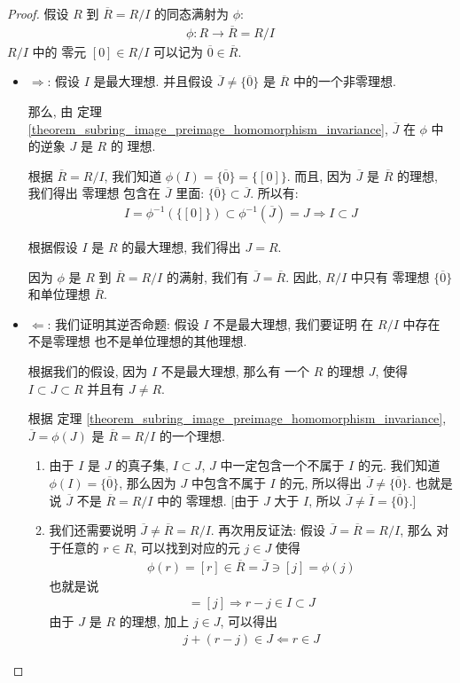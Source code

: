 \documentclass[utf8]{ctexbook}
\begin{document}
\begin{proof}
假设 $R$ 到 $\overline{R} = R/I$ 的同态满射为 $\phi$:
\begin{align*}
\phi: R \longrightarrow \overline{R} = R/I
\end{align*}
$R/I$ 中的 零元 $[0] \in R/I $ 可以记为 $\overline{0} \in \overline{R} $.

\begin{itemize}
\item{$\Longrightarrow$: 假设 $I$ 是最大理想. 并且假设 $\overline{J} \neq \{ \overline{0} \}$ 是 $\overline{R}$ 中的一个非零理想. 

那么, 由 定理 \ref{theorem_subring_image_preimage_homomorphism_invariance}, $\overline{J}$ 在 $\phi$ 中的逆象 $J$ 是 $R$ 的 理想. 

根据 $\overline{R}= R/I$, 我们知道 $\phi(I) = \{ \overline{0} \} = \{ [0] \}$. 而且, 因为 $\overline{J}$ 是 $\overline{R}$ 的理想, 我们得出 零理想 包含在 $\overline{J}$ 里面: $ \{ \overline{0} \} \subset \overline{J} $. 所以有:
\begin{align*}
I = \phi^{-1} (\{ [0] \}) \subset \phi^{-1} (\overline{J}) = J \Longrightarrow I \subset J
\end{align*}

根据假设 $I$ 是 $R$ 的最大理想, 我们得出 $J = R$.

因为 $\phi$ 是 $R$ 到 $\overline{R} =  R/I$ 的满射, 我们有 $\overline{J} = \overline{R} $. 因此, $R/I$ 中只有 零理想 $\{ \overline{0} \}$ 和单位理想 $\overline{R}$.
}
\item{$\Longleftarrow$: 我们证明其逆否命题: 假设 $I$ 不是最大理想, 我们要证明 在 $R/I$ 中存在 不是零理想 也不是单位理想的其他理想.

根据我们的假设, 因为 $I$ 不是最大理想, 那么有 一个 $R$ 的理想 $J$, 使得 $I \subset J \subset R$ 并且有 $J \neq R$. 

根据 定理 \ref{theorem_subring_image_preimage_homomorphism_invariance}, $\overline{J} = \phi(J) $ 是 $\overline{R} = R/I$ 的一个理想.

\begin{enumerate}
\item{由于 $I$ 是 $J$ 的真子集, $I \subset J$, $J$ 中一定包含一个不属于 $I$ 的元. 我们知道 $\phi(I) = \{ \overline{0} \}$, 那么因为 $J$ 中包含不属于 $I$ 的元, 所以得出 $\overline{J} \neq \{ \overline{0 }\}$. 也就是说 $\overline{J}$ 不是 $\overline{R} = R/I$ 中的 零理想. [由于 $J$ 大于 $I$, 所以 $\overline{J} \neq \overline{I} = \{ \overline{0} \}$.]}
\item{我们还需要说明 $\overline{J} \neq \overline{R} = R/I$. 再次用反证法: 假设 $\overline{J} = \overline{R} = R/I$, 那么 对于任意的 $r \in R$, 可以找到对应的元 $j \in J$ 使得 
\begin{align*}
\phi(r) = [r] \in \overline{R} =  \overline{J} \ni [j] = \phi(j)
\end{align*}
也就是说
\begin{align*}
[r] = [j] \Longrightarrow r - j \in I \subset J
\end{align*}
由于 $J$ 是 $R$ 的理想, 加上 $j \in J$, 可以得出
\begin{align*}
j + (r - j) \in J \Longleftarrow r \in J
\end{align*}

}
\end{enumerate}}
\end{itemize}
\end{proof}
\end{document}
